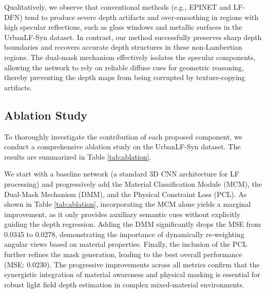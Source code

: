 \documentclass[lettersize,journal]{IEEEtran}
\begin{document}
Qualitatively, we observe that conventional methods (e.g., EPINET and LF-DFN) tend to produce severe depth artifacts and over-smoothing in regions with high specular reflections, such as glass windows and metallic surfaces in the UrbanLF-Syn dataset. In contrast, our method successfully preserves sharp depth boundaries and recovers accurate depth structures in these non-Lambertian regions. The dual-mask mechanism effectively isolates the specular components, allowing the network to rely on reliable diffuse cues for geometric reasoning, thereby preventing the depth maps from being corrupted by texture-copying artifacts.

\subsection{Ablation Study}

To thoroughly investigate the contribution of each proposed component, we conduct a comprehensive ablation study on the UrbanLF-Syn dataset. The results are summarized in Table \ref{tab:ablation}. 

We start with a baseline network (a standard 3D CNN architecture for LF processing) and progressively add the Material Classification Module (MCM), the Dual-Mask Mechanism (DMM), and the Physical Constraint Loss (PCL). As shown in Table \ref{tab:ablation}, incorporating the MCM alone yields a marginal improvement, as it only provides auxiliary semantic cues without explicitly guiding the depth regression. Adding the DMM significantly drops the MSE from 0.0345 to 0.0278, demonstrating the importance of dynamically re-weighting angular views based on material properties. Finally, the inclusion of the PCL further refines the mask generation, leading to the best overall performance (MSE: 0.0230). The progressive improvements across all metrics confirm that the synergistic integration of material awareness and physical masking is essential for robust light field depth estimation in complex mixed-material environments.

\begin{table}[htbp]
\centering
\caption{Ablation Study of the Proposed Components on the UrbanLF-Syn Dataset}
\label{tab:ablation}
\end{table}
\end{document}
